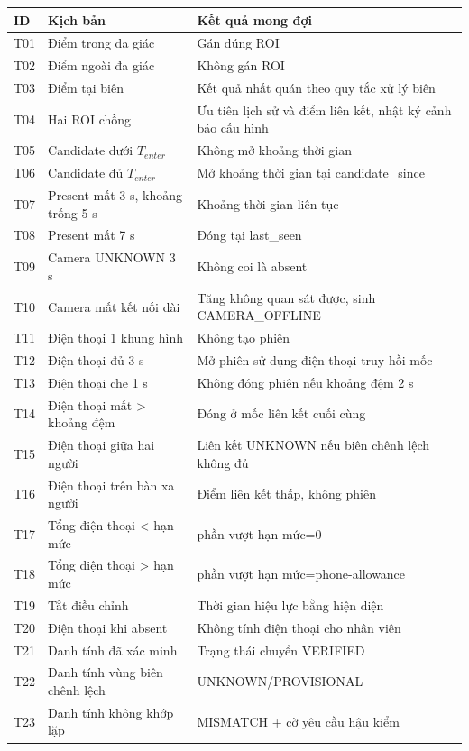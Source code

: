 \begin{longtable}{p{1.1cm}p{4.6cm}p{7.5cm}}
\toprule
\textbf{ID} & \textbf{Kịch bản} & \textbf{Kết quả mong đợi}\\
\midrule\endfirsthead
T01 & Điểm trong đa giác & Gán đúng ROI\\
T02 & Điểm ngoài đa giác & Không gán ROI\\
T03 & Điểm tại biên & Kết quả nhất quán theo quy tắc xử lý biên\\
T04 & Hai ROI chồng & Ưu tiên lịch sử và điểm liên kết, nhật ký cảnh báo cấu hình\\
T05 & Candidate dưới $T_{enter}$ & Không mở khoảng thời gian\\
T06 & Candidate đủ $T_{enter}$ & Mở khoảng thời gian tại candidate\_since\\
T07 & Present mất 3 s, khoảng trống 5 s & Khoảng thời gian liên tục\\
T08 & Present mất 7 s & Đóng tại last\_seen\\
T09 & Camera UNKNOWN 3 s & Không coi là absent\\
T10 & Camera mất kết nối dài & Tăng không quan sát được, sinh CAMERA\_OFFLINE\\
T11 & Điện thoại 1 khung hình & Không tạo phiên\\
T12 & Điện thoại đủ 3 s & Mở phiên sử dụng điện thoại truy hồi mốc\\
T13 & Điện thoại che 1 s & Không đóng phiên nếu khoảng đệm 2 s\\
T14 & Điện thoại mất > khoảng đệm & Đóng ở mốc liên kết cuối cùng\\
T15 & Điện thoại giữa hai người & Liên kết UNKNOWN nếu biên chênh lệch không đủ\\
T16 & Điện thoại trên bàn xa người & Điểm liên kết thấp, không phiên\\
T17 & Tổng điện thoại < hạn mức & phần vượt hạn mức=0\\
T18 & Tổng điện thoại > hạn mức & phần vượt hạn mức=phone-allowance\\
T19 & Tắt điều chỉnh & Thời gian hiệu lực bằng hiện diện\\
T20 & Điện thoại khi absent & Không tính điện thoại cho nhân viên\\
T21 & Danh tính đã xác minh & Trạng thái chuyển VERIFIED\\
T22 & Danh tính vùng biên chênh lệch & UNKNOWN/PROVISIONAL\\
T23 & Danh tính không khớp lặp & MISMATCH + cờ yêu cầu hậu kiểm\\

\end{longtable}
